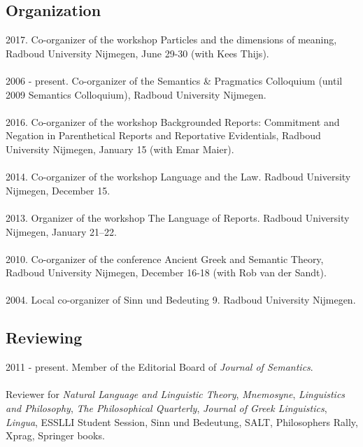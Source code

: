 \documentclass[a4paper,11pt]{article}
\begin{document}
\subsection*{Organization}
2017. Co-organizer of the workshop Particles and the dimensions of meaning, Radboud University Nijmegen, June 29-30 (with Kees Thijs).\\\\
2006 - present. Co-organizer of the Semantics \& Pragmatics Colloquium (until 2009 Semantics Colloquium), Radboud University Nijmegen.\\\\
2016. Co-organizer of the workshop Backgrounded Reports: Commitment and Negation in Parenthetical Reports and Reportative Evidentials, Radboud University Nijmegen, January 15 (with Emar Maier).\\\\
2014. Co-organizer of the workshop Language and the Law. Radboud University Nijmegen, December 15.\\\\
2013. Organizer of the workshop The Language of Reports. Radboud University Nijmegen, January 21--22.\\\\
2010. Co-organizer of the conference Ancient Greek and Semantic Theory, Radboud University Nijmegen, December 16-18 (with Rob van der Sandt).\\\\
 2004. Local co-organizer of Sinn und Bedeuting 9. Radboud University Nijmegen.


\subsection*{Reviewing}

2011 - present. Member of the Editorial Board of \emph{Journal of Semantics}.\\\\
Reviewer for  \emph{Natural Language and Linguistic Theory}, \emph{Mnemosyne}, \emph{Linguistics and Philosophy}, \emph{The Philosophical Quarterly}, \emph{Journal of Greek Linguistics}, \emph{Lingua}, ESSLLI Student Session, Sinn und Bedeutung, SALT, Philosophers Rally, Xprag, Springer books. 
\end{document}
